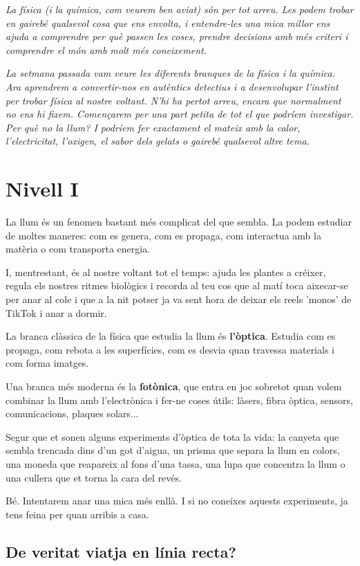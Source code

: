 
\textit{
La física (i la química, com veurem ben aviat) són per tot arreu. Les podem trobar en gairebé qualsevol cosa que ens envolta, i entendre-les una mica millor ens ajuda a comprendre per què passen les coses, prendre decisions amb més criteri i comprendre el món amb molt més coneixement.
}

\textit{
La setmana passada vam veure les diferents branques de la física i la química. Ara aprendrem a convertir-nos en autèntics detectius i a desenvolupar l’instint per trobar física al nostre voltant. N’hi ha pertot arreu, encara que normalment no ens hi fixem. Començarem per una part petita de tot el que podríem investigar. Per què no la llum? I podríem fer exactament el mateix amb la calor, l’electricitat, l’oxigen, el sabor dels gelats o gairebé qualsevol altre tema.
}

\section{Nivell I }

La llum és un fenomen bastant més complicat del que sembla. La podem estudiar de moltes maneres: com es genera, com es propaga, com interactua amb la matèria o com transporta energia.

I, mentrestant, és al nostre voltant tot el temps: ajuda les plantes a créixer, regula els nostres ritmes biològics i recorda al teu cos que al matí toca aixecar-se per anar al cole i que a la nit potser ja va sent hora de deixar els reels 'monos' de TikTok i anar a dormir.

La branca clàssica de la física que estudia la llum és \textbf{l’òptica}. Estudia com es propaga, com rebota a les superfícies, com es desvia quan travessa materials i com forma imatges.

Una branca més moderna és la \textbf{fotònica}, que entra en joc sobretot quan volem combinar la llum amb l’electrònica i fer-ne coses útils: làsers, fibra òptica, sensors, comunicacions, plaques solars...

Segur que et sonen alguns experiments d’òptica de tota la vida: la canyeta que sembla trencada dins d’un got d’aigua, un prisma que separa la llum en colors, una moneda que reapareix al fons d’una tassa, una lupa que concentra la llum o una cullera que et torna la cara del revés.

Bé. Intentarem anar una mica més enllà. I si no coneixes aquests experiments, ja tens feina per quan arribis a casa.

\subsection{De veritat viatja en línia recta?}

